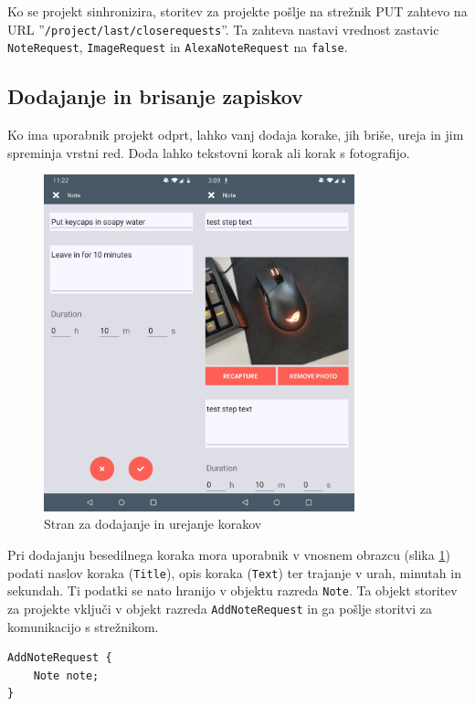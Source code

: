 \documentclass[a4paper, 12pt]{book}
\begin{document}
Ko se projekt sinhronizira, storitev za projekte pošlje na strežnik PUT zahtevo na URL ''\texttt{/project/last/closerequests}''.
Ta zahteva nastavi vrednost zastavic \texttt{NoteRequest}, \texttt{ImageRequest} in \texttt{AlexaNoteRequest} na \texttt{false}.


\subsection{Dodajanje in brisanje zapiskov}

Ko ima uporabnik projekt odprt, lahko vanj dodaja korake, jih briše, ureja in jim spreminja vrstni red.
Doda lahko tekstovni korak ali korak s fotografijo.

\begin{figure}[H]
\begin{center}
	\includegraphics[width=9cm]{app_note_image}
\end{center}
	\caption{Stran za dodajanje in urejanje korakov}
\label{app_note}
\end{figure}

Pri dodajanju besedilnega koraka mora uporabnik v vnosnem obrazcu (slika \ref{app_note}) podati naslov koraka (\texttt{Title}), opis koraka (\texttt{Text}) ter trajanje v urah, minutah in sekundah.
Ti podatki se nato hranijo v objektu razreda \texttt{Note}.
Ta objekt storitev za projekte vključi v objekt razreda \texttt{AddNoteRequest} in ga pošlje storitvi za komunikacijo s strežnikom.

\begin{Verbatim}[commandchars=+\[\]]
AddNoteRequest { 
    Note note; 
}
\end{Verbatim}
\end{document}
